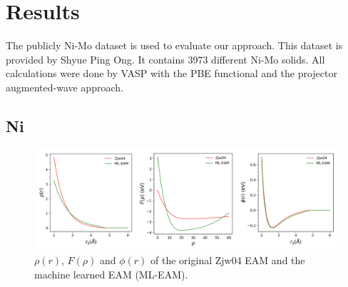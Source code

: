 \documentclass[prb,reprint]{revtex4-2}
\begin{document}
% 
%
\section{Results}
\label{sec:results}

The publicly Ni-Mo dataset is used to evaluate our approach. This dataset is 
provided by Shyue Ping Ong. It contains 3973 different Ni-Mo solids. All 
calculations were done by VASP with the PBE functional and the projector 
augmented-wave approach.

% 
%
\subsection{Ni}
\label{sec:elementary_Ni}

% 
%
\begin{figure}[h!]
\centering
\includegraphics[scale=0.57]{figures/Ni_eam.png}
\caption{\label{fig:Ni_eam} $\rho(r)$, $F(\rho)$ and $\phi(r)$ of the original 
Zjw04 EAM and the machine learned EAM (ML-EAM).}
\end{figure}
\end{document}
